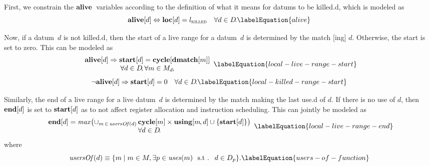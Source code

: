 First, we constrain the $\mVar{alive}$~\glspl{variable} according to the
definition of what it means for \glspl{datum} to be \gls{killed.d}, which is
modeled as
%
\begin{equation}
  \mVar{alive}[d]
  \mEq
  \mVar{loc}[d] = \mKilledLocation
  \mQuantSep
  \forall d \in \mDataSet \!.
  \labelEquation{alive}
\end{equation}

Now, if a \gls{datum}~$d$ is not \gls{killed.d}, then the start of a \gls{live
  range} for a \gls{datum}~$d$ is determined by the \gls{match}
[ing] $d$\hspace{-1pt}.
%
Otherwise, the start is set to zero.
%
This can be modeled as
%
\begin{equation}
  \begin{array}{c}
    \mVar{alive}[d]
    \mImp
    \mVar{start}[d] = \mVar{cycle}[\mVar{dmatch}[m]] \\
    \forall d \in \mDataSet \!,
    \forall m \in \mMatchSet[d] \hspace{-.8pt},
  \end{array}
  \labelEquation{local-live-range-start}
\end{equation}
%
\begin{equation}
  \neg\mVar{alive}[d]
  \mImp
  \mVar{start}[d] = 0
  \mQuantSep
  \forall d \in \mDataSet \!.
  \labelEquation{local-killed-range-start}
\end{equation}

Similarly, the end of a \gls{live range} for a live \gls{datum}~$d$ is
determined by the \gls{match} making the last \gls{use.d} of $d$\hspace{-1pt}.
%
If there is no use of $d$, then $\mVar{end}[d]$ is set to $\mVar{start}[d]$ as
to not affect \gls{register allocation} and \gls{instruction scheduling}.
%
This can jointly be modeled as
%
\begin{equation}
  \begin{array}{c}
    \mVar{end}[d] =
    \mMax\!
    \left(
      \cup_{m \,\in\, \mUsersOf(d)} \,
      \mVar{cycle}[m]
      \times
      \mVar{using}[m \hspace{-1pt}, d]
      \cup
      \mSet{\mVar{start}[d]}
    \right) \\
    \forall d \in \mDataSet \!.
  \end{array}
  \labelEquation{local-live-range-end}
\end{equation}
%
where
%
\begin{equation}
  \mUsersOf(d)
  \equiv
  \mSetBuilder{m}%
              {
                m \in \mMatchSet,
                \exists p \in \mUses(m)
                \text{ \st } d \in \mDataSet[p]
              }.
  \labelEquation{users-of-function}
\end{equation}

